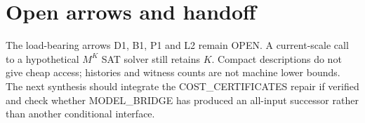 \documentclass[11pt]{article}
\begin{document}
\section*{Open arrows and handoff}
The load-bearing arrows D1, B1, P1 and L2 remain OPEN.  A current-scale call to
a hypothetical $M^K$ SAT solver still retains $K$.  Compact descriptions do not
give cheap access; histories and witness counts are not machine lower bounds.
The next synthesis should integrate the COST\_CERTIFICATES repair if verified
and check whether MODEL\_BRIDGE has produced an all-input successor rather than
another conditional interface.

\end{document}
